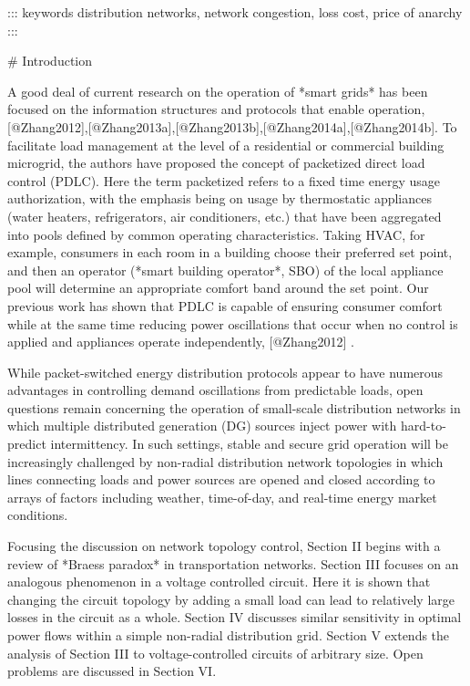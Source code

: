 ::: keywords distribution networks, network congestion, loss cost, price of anarchy :::

# Introduction

A good deal of current research on the operation of *smart grids* has been focused on the information structures and protocols that enable operation, [@Zhang2012],[@Zhang2013a],[@Zhang2013b],[@Zhang2014a],[@Zhang2014b]. To facilitate load management at the level of a residential or commercial building microgrid, the authors have proposed the concept of packetized direct load control (PDLC). Here the term packetized refers to a fixed time energy usage authorization, with the emphasis being on usage by thermostatic appliances (water heaters, refrigerators, air conditioners, etc.) that have been aggregated into pools defined by common operating characteristics. Taking HVAC, for example, consumers in each room in a building choose their preferred set point, and then an operator (*smart building operator*, SBO) of the local appliance pool will determine an appropriate comfort band around the set point. Our previous work has shown that PDLC is capable of ensuring consumer comfort while at the same time reducing power oscillations that occur when no control is applied and appliances operate independently, [@Zhang2012] .

While packet-switched energy distribution protocols appear to have numerous advantages in controlling demand oscillations from predictable loads, open questions remain concerning the operation of small-scale distribution networks in which multiple distributed generation (DG) sources inject power with hard-to-predict intermittency. In such settings, stable and secure grid operation will be increasingly challenged by non-radial distribution network topologies in which lines connecting loads and power sources are opened and closed according to arrays of factors including weather, time-of-day, and real-time energy market conditions.

Focusing the discussion on network topology control, Section II begins with a review of *Braess paradox* in transportation networks. Section III focuses on an analogous phenomenon in a voltage controlled circuit. Here it is shown that changing the circuit topology by adding a small load can lead to relatively large losses in the circuit as a whole. Section IV discusses similar sensitivity in optimal power flows within a simple non-radial distribution grid. Section V extends the analysis of Section III to voltage-controlled circuits of arbitrary size. Open problems are discussed in Section VI.

